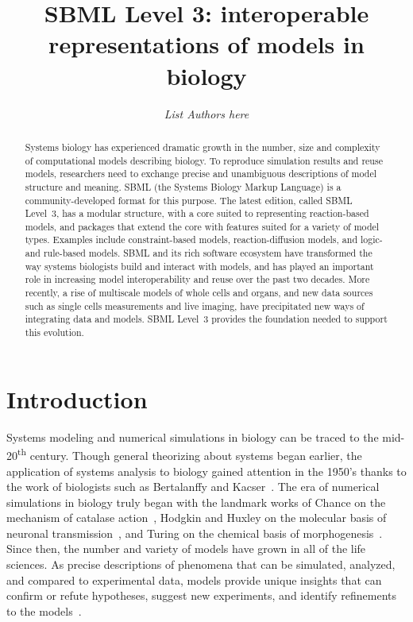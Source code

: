 \documentclass[]{draft-sbml-paper}
\title{SBML Level 3: interoperable representations of models in biology}
\author[1]{\emph{List Authors here}}
\begin{document}
\maketitle

\begin{abstract}
Systems biology has experienced dramatic growth in the number, size and complexity of computational models describing biology. To reproduce simulation results and reuse models, researchers need to exchange precise and unambiguous descriptions of model structure and meaning. SBML (the Systems Biology Markup Language) is a community-developed format for this purpose. The latest edition, called SBML Level~3, has a modular structure, with a core suited to representing reaction-based models, and packages that extend the core with features suited for a variety of model types. Examples include constraint-based models, reaction-diffusion models, and logic- and rule-based models. SBML and its rich software ecosystem have transformed the way systems biologists build and interact with models, and has played an important role in increasing model interoperability and reuse over the past two decades. More recently, a rise of multiscale models of whole cells and organs, and new data sources such as single cells measurements and live imaging, have precipitated new ways of integrating data and models. SBML Level~3 provides the foundation needed to support this evolution.
\end{abstract}

\clearpage

\section*{Introduction}

Systems modeling and numerical simulations in biology can be traced to the mid-20\textsuperscript{th} century. Though general theorizing about systems began earlier, the application of systems analysis to biology gained attention in the 1950's thanks to the work of biologists such as Bertalanffy and Kacser~\citep{Von_Bertalanffy1950-dy, Von_Bertalanffy1950-wa, Kacser1957-ox, kell2006theodor}. The era of numerical simulations in biology truly began with the landmark works of Chance on the mechanism of catalase action~\citep{chance1952mechanism}, Hodgkin and Huxley on the molecular basis of neuronal transmission~\citep{hodgkin1952quantitative}, and Turing on the chemical basis of morphogenesis~\citep{turing1990chemical}. Since then, the number and variety of models have grown in all of the life sciences. As precise descriptions of phenomena that can be simulated, analyzed, and compared to experimental data, models provide unique insights that can confirm or refute hypotheses, suggest new experiments, and identify refinements to the models~\citep{Heinrich1996, le_novere_2015}.
\end{document}

